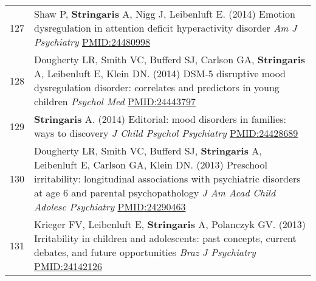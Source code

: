 \documentclass[
]{article}
\begin{document}
\begin{longtable}[]{@{}ll@{}}
\begin{minipage}[t]{0.01\columnwidth}\raggedright
127\strut
\end{minipage} & \begin{minipage}[t]{0.94\columnwidth}\raggedright
Shaw P, \textbf{Stringaris} A, Nigg J, Leibenluft E. (2014) Emotion
dysregulation in attention deficit hyperactivity disorder \emph{Am J
Psychiatry} \url{PMID:24480998}\strut
\end{minipage}\tabularnewline
\begin{minipage}[t]{0.01\columnwidth}\raggedright
128\strut
\end{minipage} & \begin{minipage}[t]{0.94\columnwidth}\raggedright
Dougherty LR, Smith VC, Bufferd SJ, Carlson GA, \textbf{Stringaris} A,
Leibenluft E, Klein DN. (2014) DSM-5 disruptive mood dysregulation
disorder: correlates and predictors in young children \emph{Psychol Med}
\url{PMID:24443797}\strut
\end{minipage}\tabularnewline
\begin{minipage}[t]{0.01\columnwidth}\raggedright
129\strut
\end{minipage} & \begin{minipage}[t]{0.94\columnwidth}\raggedright
\textbf{Stringaris} A. (2014) Editorial: mood disorders in families:
ways to discovery \emph{J Child Psychol Psychiatry}
\url{PMID:24428689}\strut
\end{minipage}\tabularnewline
\begin{minipage}[t]{0.01\columnwidth}\raggedright
130\strut
\end{minipage} & \begin{minipage}[t]{0.94\columnwidth}\raggedright
Dougherty LR, Smith VC, Bufferd SJ, \textbf{Stringaris} A, Leibenluft E,
Carlson GA, Klein DN. (2013) Preschool irritability: longitudinal
associations with psychiatric disorders at age 6 and parental
psychopathology \emph{J Am Acad Child Adolesc Psychiatry}
\url{PMID:24290463}\strut
\end{minipage}\tabularnewline
\begin{minipage}[t]{0.01\columnwidth}\raggedright
131\strut
\end{minipage} & \begin{minipage}[t]{0.94\columnwidth}\raggedright
Krieger FV, Leibenluft E, \textbf{Stringaris} A, Polanczyk GV. (2013)
Irritability in children and adolescents: past concepts, current
debates, and future opportunities \emph{Braz J Psychiatry}
\url{PMID:24142126}\strut
\end{minipage}\tabularnewline

\end{longtable}
\end{document}
